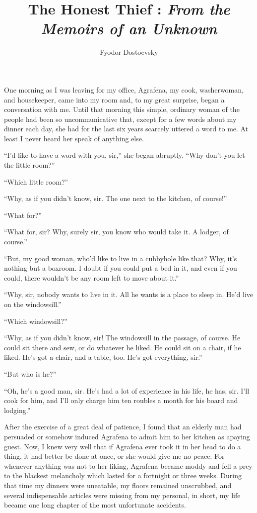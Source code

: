 \documentclass[a4paper,10pt]{article}
\title{The Honest Thief : \textit{From the Memoirs of an Unknown}}
\author{Fyodor Dostoevsky}
\begin{document}
\maketitle

One morning as I was leaving for my office, Agrafena, my cook, washerwoman, and housekeeper, came into my room and, to my great surprise, began a conversation with me.
Until that morning this simple, ordinary woman of the people had been so uncommunicative that, except for a few words about my dinner each day, she had for the last six years scarcely uttered a word to me.
At least I never heard her speak of anything else.

``I'd like to have a word with you, sir,'' she began abruptly.
``Why don't you let the little room?''

``Which little room?''

``Why, as if you didn't know, sir.
The one next to the kitchen, of course!''

``What for?''

``What for, sir?
Why, surely sir, you know who would take it.
A lodger, of course.''

``But, my good woman, who'd like to live in a cubbyhole like that?
Why, it's nothing but a boxroom.
I doubt if you could put a bed in it, and even if you could, there wouldn't be any room left to move about it.''

``Why, sir, nobody wants to live in it.
All he wants is a place to sleep in.
He'd live on the windowsill.''

``Which windowsill?''

``Why, as if you didn't know, sir!
The windowsill in the passage, of course.
He could sit there and sew, or do whatever he liked.
He could sit on a chair, if he liked.
He's got a chair, and a table, too.
He's got everything, sir.''

``But who is he?''

``Oh, he's a good man, sir.
He's had a lot of experience in his life, he has, sir.
I'll cook for him, and I'll only charge him ten roubles a month for his board and lodging.''

After the exercise of a great deal of patience, I found that an elderly man had persuaded or somehow induced Agrafena to admit him to her kitchen as apaying guest.
Now, I knew very well that if Agrafena ever took it in her head to do a thing, it had better be done at once, or she would give me no peace.
For whenever anything was not to her liking, Agrafena became moddy and fell a prey to the blackest melancholy which lasted for a fortnight or three weeks.
During that time my dinners were uneatable, my floors remained unscrubbed, and several indispensable articles were missing from my personal, in short, my life became one long chapter of the most unfortunate accidents.
\end{document}
